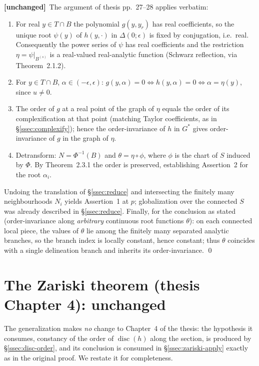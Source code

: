 \documentclass[11pt,a4paper]{article}
\theoremstyle{plain}
\theoremstyle{definition}
\DeclareMathOperator{\disc}{disc}
\newcommand{\UNCHANGED}{\textbf{[unchanged]}}
\begin{document}
\UNCHANGED\ The argument of thesis pp.~27--28 applies verbatim:
\begin{enumerate}[leftmargin=2em]
\item For real $y\in T\cap B$ the polynomial $g(y,y_r)$ has real
coefficients, so the unique root $\psi(y)$ of $h(y,\cdot)$ in
$\Delta(0;\epsilon)$ is fixed by conjugation, i.e.\ real. Consequently the
power series of $\psi$ has real coefficients and the restriction
$\eta=\psi|_{B^{(s)}}$ is a real-valued real-analytic function (Schwarz
reflection, via Theorem~2.1.2).
\item For $y\in T\cap B$, $\alpha\in(-\epsilon,\epsilon)$:
$g(y,\alpha)=0\iff h(y,\alpha)=0\iff\alpha=\eta(y)$, since $u\neq0$.
\item The order of $g$ at a real point of the graph of $\eta$ equals the
order of its complexification at that point (matching Taylor coefficients,
as in \S\ref{ssec:complexify}); hence the order-invariance of $h$ in $G^*$
gives order-invariance of $g$ in the graph of $\eta$.
\item Detransform: $N=\Phi^{-1}(B)$ and $\theta=\eta\circ\phi$, where $\phi$
is the chart of $S$ induced by $\Phi$. By Theorem~2.3.1 the order is
preserved, establishing Assertion~2 for the root $\alpha_i$.
\end{enumerate}
Undoing the translation of \S\ref{ssec:reduce} and intersecting the finitely
many neighbourhoods $N_i$ yields Assertion~1 at $p$; globalization over the
connected $S$ was already described in \S\ref{ssec:reduce}. Finally, for the
conclusion as stated (order-invariance along \emph{arbitrary} continuous root
functions $\theta$): on each connected local piece, the values of $\theta$ lie
among the finitely many separated analytic branches, so the branch index is
locally constant, hence constant; thus $\theta$ coincides with a single
delineation branch and inherits its order-invariance. \qed

\section{The Zariski theorem (thesis Chapter 4): unchanged}
\label{sec:zariski}

The generalization makes \emph{no} change to Chapter~4 of the thesis: the
hypothesis it consumes, constancy of the order of $\disc(h)$ along the
section, is produced by \S\ref{ssec:disc-order}, and its conclusion is
consumed in \S\ref{ssec:zariski-apply} exactly as in the original proof. We
restate it for completeness.
\end{document}
